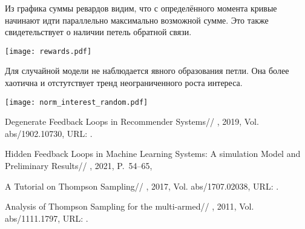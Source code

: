\documentclass[12pt, twoside]{article}
\begin{document}
Из графика суммы ревардов видим, что с определённого момента кривые начинают идти параллельно максимально возможной сумме. 
Это также свидетельствует о наличии петель обратной связи. 
\begin{center}
  \texttt{[image: rewards.pdf]}
\end{center}

Для случайной модели не наблюдается явного образования петли. 
Она более хаотична и отстутствует тренд неограниченного роста интереса.   
\begin{center}
  \texttt{[image: norm\_interest\_random.pdf]}
\end{center}
\begin{thebibliography}{99}
    Degenerate Feedback Loops in Recommender Systems//
    , 2019, Vol. abs/1902.10730,
	  URL: .

    Hidden Feedback Loops in Machine Learning Systems: A simulation Model and Preliminary Results//
    , 2021, P.~54--65,

    A Tutorial on Thompson Sampling//
    , 2017, Vol. abs/1707.02038,
	  URL: .

    Analysis of Thompson Sampling for the multi-armed//
    , 2011, Vol. abs/1111.1797,
	  URL: .
\end{thebibliography}

\end{document}
